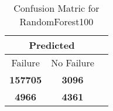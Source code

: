 \begin{table}[] 
\caption{Confusion Matric for RandomForest100} 
\label{Table: Prediction Accuracy-DMDRandomForest100100.0EKF-ignoreReflection-Reflection} 
\centering 
\begin{tabular} 
 {@{}ccc@{}} 
\toprule 
\multicolumn{2}{c}{\textbf{Predicted}}
 \\ \midrule 
\multicolumn{1}{|c|}{Failure} & 
\multicolumn{1}{c|}{No Failure}
 \\ \midrule 
\multicolumn{1}{|c|}{\color{green}\textbf{157705}} & 
\multicolumn{1}{c|}{\color{red}\textbf{3096}}
 \\ \midrule 
\multicolumn{1}{|c|}{\color{red}\textbf{4966}} & 
\multicolumn{1}{c|}{\color{green}\textbf{4361}}
 \\ \bottomrule 
\end{tabular} 
\end{table} 
